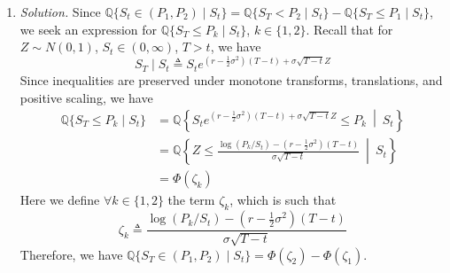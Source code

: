 \documentclass{article}
\numberwithin{equation}{section}
\begin{document}
\begin{enumerate}[label = \alph*.]
    \item
    \textit{Solution.} Since $ \mathbb{Q}\{S_t \in (P_1, P_2) \mid S_t\} =
    \mathbb{Q}\{S_T < P_2 \mid S_t\} - \mathbb{Q}\{S_T \le P_1 \mid S_t\} $,
    we seek an expression for $ \mathbb{Q}\{S_T \le P_k \mid S_t\} $,
    $ k \in \{1, 2\} $. Recall that for $ Z \sim N(0, 1) $,
    $ S_t \in (0, \infty) $, $ T > t $, we have
    \begin{equation*}
	    S_T \mid S_t \triangleq S_te^{
	        \left(r - \frac{1}{2}\sigma^2\right)(T - t) + \sigma\sqrt{T - t}Z
	    }
	\end{equation*}
    Since inequalities are preserved under monotone transforms, translations,
    and positive scaling, we have
    \begin{equation*}
        \begin{split}
        \mathbb{Q}\{S_T \le P_k \mid S_t\} & = \mathbb{Q}\left\{
            S_te^{
                \left(r - \frac{1}{2}\sigma^2\right)(T - t) +
                \sigma\sqrt{T - t}Z
            } \le P_k \ \middle\vert \ S_t
        \right\} \\
        & = \mathbb{Q}\left\{
            Z \le \frac{
                \log(P_k / S_t) - \left(r - \frac{1}{2}\sigma^2\right)(T - t)
            }{\sigma\sqrt{T - t}} \ \middle\vert \ S_t
        \right\} \\
        & = \Phi(\zeta_k)
	    \end{split}
    \end{equation*}
    Here we define $ \forall k \in \{1, 2\} $ the term $ \zeta_k $, which is
    such that
    \begin{equation*}
        \zeta_k \triangleq \frac{
            \log(P_k / S_t) - \left(r - \frac{1}{2}\sigma^2\right)(T - t)
        }{\sigma\sqrt{T - t}}
    \end{equation*}
    Therefore, we have $ \mathbb{Q}\{S_T \in (P_1, P_2) \mid S_t\} =
    \Phi(\zeta_2) - \Phi(\zeta_1) $.
\end{enumerate}
\end{document}
